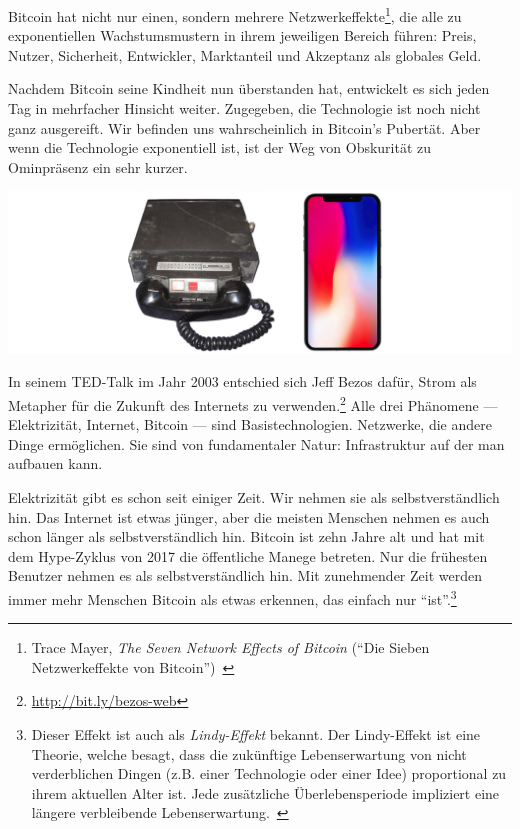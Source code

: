 Bitcoin hat nicht nur einen, sondern mehrere Netzwerkeffekte\footnote{Trace
Mayer, \textit{The Seven Network Effects of Bitcoin} (\enquote{Die Sieben
Netzwerkeffekte von Bitcoin})~\cite{7-network-effects}}, die alle zu
exponentiellen Wachstumsmustern in ihrem jeweiligen Bereich führen: Preis,
Nutzer, Sicherheit, Entwickler, Marktanteil und Akzeptanz als globales Geld.

Nachdem Bitcoin seine Kindheit nun überstanden hat, entwickelt es sich jeden Tag
in mehrfacher Hinsicht weiter. Zugegeben, die Technologie ist noch nicht ganz
ausgereift. Wir befinden uns wahrscheinlich in Bitcoin's Pubertät. Aber wenn die
Technologie exponentiell ist, ist der Weg von Obskurität zu Ominpräsenz ein sehr
kurzer.

\begin{center}
  \includegraphics[width=\textwidth]{assets/images/mobile-phone.png}
  \label{fig:mobile-phone}
\end{center}

In seinem TED-Talk im Jahr 2003 entschied sich Jeff Bezos dafür, Strom als
Metapher für die Zukunft des Internets zu
verwenden.\footnote{\url{http://bit.ly/bezos-web}} Alle drei Phänomene ---
Elektrizität, Internet, Bitcoin --- sind Basistechnologien. Netzwerke, die
andere Dinge ermöglichen. Sie sind von fundamentaler Natur: Infrastruktur auf
der man aufbauen kann.

Elektrizität gibt es schon seit einiger Zeit. Wir nehmen sie als
selbstverständlich hin. Das Internet ist etwas jünger, aber die meisten Menschen
nehmen es auch schon länger als selbstverständlich hin. Bitcoin ist zehn Jahre
alt und hat mit dem Hype-Zyklus von 2017 die öffentliche Manege betreten. Nur
die frühesten Benutzer nehmen es als selbstverständlich hin. Mit zunehmender
Zeit werden immer mehr Menschen Bitcoin als etwas erkennen, das einfach nur
\enquote{ist}.\footnote{Dieser Effekt ist auch als \textit{Lindy-Effekt}
bekannt. Der Lindy-Effekt ist eine Theorie, welche besagt, dass die zukünftige
Lebenserwartung von nicht verderblichen Dingen (z.B. einer Technologie oder einer
Idee) proportional zu ihrem aktuellen Alter ist. Jede zusätzliche
Überlebensperiode impliziert eine längere verbleibende
Lebenserwartung.~\cite{wiki:lindy}}

